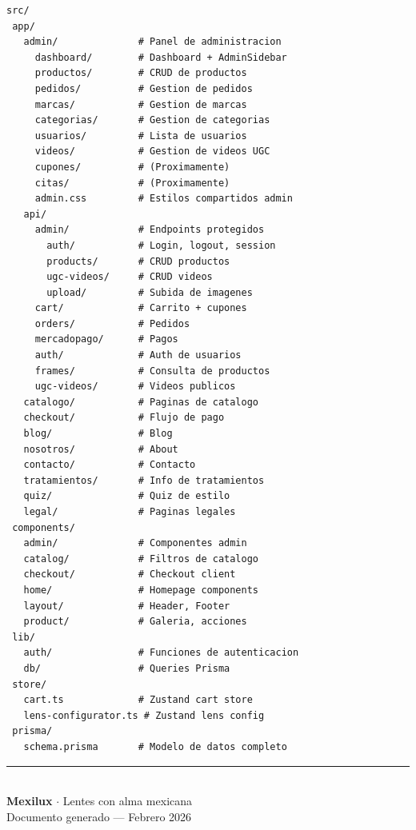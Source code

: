 \documentclass[12pt, a4paper]{article}
\begin{document}
\begin{lstlisting}[style=mexcode]
src/
 app/
   admin/              # Panel de administracion
     dashboard/        # Dashboard + AdminSidebar
     productos/        # CRUD de productos
     pedidos/          # Gestion de pedidos
     marcas/           # Gestion de marcas
     categorias/       # Gestion de categorias
     usuarios/         # Lista de usuarios
     videos/           # Gestion de videos UGC
     cupones/          # (Proximamente)
     citas/            # (Proximamente)
     admin.css         # Estilos compartidos admin
   api/
     admin/            # Endpoints protegidos
       auth/           # Login, logout, session
       products/       # CRUD productos
       ugc-videos/     # CRUD videos
       upload/         # Subida de imagenes
     cart/             # Carrito + cupones
     orders/           # Pedidos
     mercadopago/      # Pagos
     auth/             # Auth de usuarios
     frames/           # Consulta de productos
     ugc-videos/       # Videos publicos
   catalogo/           # Paginas de catalogo
   checkout/           # Flujo de pago
   blog/               # Blog
   nosotros/           # About
   contacto/           # Contacto
   tratamientos/       # Info de tratamientos
   quiz/               # Quiz de estilo
   legal/              # Paginas legales
 components/
   admin/              # Componentes admin
   catalog/            # Filtros de catalogo
   checkout/           # Checkout client
   home/               # Homepage components
   layout/             # Header, Footer
   product/            # Galeria, acciones
 lib/
   auth/               # Funciones de autenticacion
   db/                 # Queries Prisma
 store/
   cart.ts             # Zustand cart store
   lens-configurator.ts # Zustand lens config
 prisma/
   schema.prisma       # Modelo de datos completo
\end{lstlisting}

\vfill

\begin{center}
\color{mxgray}\rule{0.5\textwidth}{0.5pt}\\[0.5cm]
{\large\color{mxdark}\textbf{Mexilux}} {\color{mxgold}$\cdot$} {\small\color{mxgray} Lentes con alma mexicana}\\[0.2cm]
{\footnotesize\color{mxgray} Documento generado --- Febrero 2026}
\end{center}
\end{document}
